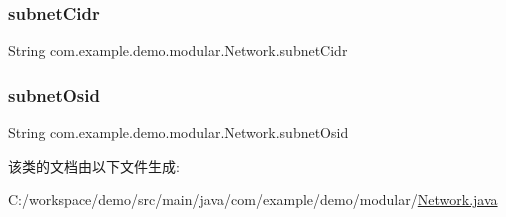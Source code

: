 \subsubsection{\texorpdfstring{subnet\+Cidr}{subnetCidr}}
{\footnotesize\ttfamily String com.\+example.\+demo.\+modular.\+Network.\+subnet\+Cidr\hspace{0.3cm}{\ttfamily [private]}}

\mbox{\label{classcom_1_1example_1_1demo_1_1modular_1_1_network_a2f70a4f8f85e28c37af005fe18074deb}} 
\subsubsection{\texorpdfstring{subnet\+Osid}{subnetOsid}}
{\footnotesize\ttfamily String com.\+example.\+demo.\+modular.\+Network.\+subnet\+Osid\hspace{0.3cm}{\ttfamily [private]}}



该类的文档由以下文件生成\+:\begin{DoxyCompactItemize}
\item 
C\+:/workspace/demo/src/main/java/com/example/demo/modular/\mbox{\hyperlink{_network_8java}{Network.\+java}}\end{DoxyCompactItemize}
